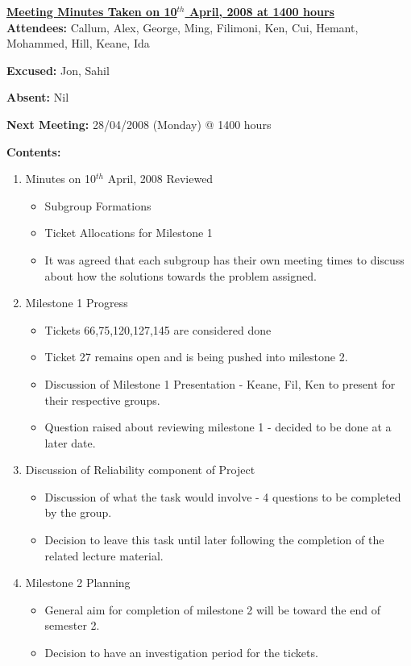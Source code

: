 \documentclass{letter}
\begin{document}
{\large \textbf{\underline{Meeting Minutes Taken on 10$^{th}$ April, 2008 at 1400 hours}}}\\

\textbf{Attendees:} Callum, Alex, George, Ming, Filimoni, Ken, Cui, Hemant, Mohammed, Hill, Keane, Ida 

\textbf{Excused:} Jon, Sahil

\textbf{Absent:} Nil

\textbf{Next Meeting:} 28/04/2008 (Monday) @ 1400 hours

\textbf{Contents:}

\begin{enumerate}
\item Minutes on 10$^{th}$ April, 2008 Reviewed
	\begin{itemize}
	\item Subgroup Formations
	\item Ticket Allocations for Milestone 1
	\item It was agreed that each subgroup has their own meeting times to discuss about how the solutions towards the problem assigned. 
	\end{itemize}
\item Milestone 1 Progress 
	\begin{itemize}
	\item Tickets 66,75,120,127,145 are considered done
	\item Ticket 27 remains open and is being pushed into milestone 2.
	\item Discussion of Milestone 1 Presentation - Keane, Fil, Ken to present for their respective groups.
	\item Question raised about reviewing milestone 1 - decided to be done at a later date.
	\end{itemize}
\item Discussion of Reliability component of Project
	\begin{itemize}
	\item Discussion of what the task would involve - 4 questions to be completed by the group.
	\item Decision to leave this task until later following the completion of the related lecture material.
	\end{itemize}
\item Milestone 2 Planning
	\begin{itemize}
	\item General aim for completion of milestone 2 will be toward the end of semester 2.
	\item Decision to have an investigation period for the tickets.

\end{itemize}
\end{enumerate}
\end{document}
